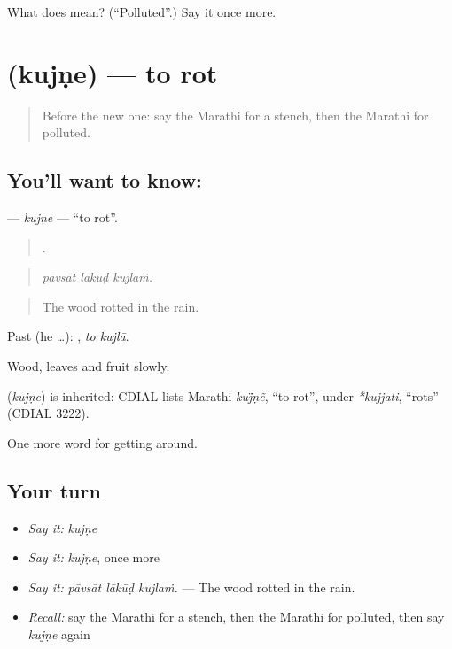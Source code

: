 \begin{tcolorbox}[breakable,colback=teal!4,colframe=teal!35!black,title={Before you move on}]
What does  mean? (\textquotedblleft{}Polluted\textquotedblright{}.) Say it once more.
\end{tcolorbox}
\section[\texorpdfstring{\mr{कुजणे} (kujṇe)}{कुजणे (kujṇe)}]{ (kujṇe) — to rot}

\label{lesson:MR-C448-kujne}



\begin{quote}
Before the new one: say the Marathi for a stench, then the Marathi for polluted.
\end{quote}

\subsection*{You'll want to know: }
\textbf{} — \emph{kujṇe} — \textquotedblleft{}to rot\textquotedblright{}.

\begin{quote}
  .
\end{quote}

\begin{quote}
\emph{pāvsāt lākūḍ kujlaṁ.}
\end{quote}

\begin{quote}
The wood rotted in the rain.
\end{quote}

Past (he …):  , \emph{to kujlā}.

Wood, leaves and fruit  slowly.

\begin{cousinweb}
\textbf{} (\emph{kujṇe}) is inherited: CDIAL lists Marathi \emph{kuj̈ṇẽ}, \textquotedblleft{}to rot\textquotedblright{}, under \emph{*kujjati}, \textquotedblleft{}rots\textquotedblright{} (CDIAL 3222).
\end{cousinweb}

\begin{grammarlens}[title={What you've built}]
One more word for getting around.
\end{grammarlens}

\subsection*{Your turn}
\begin{itemize}
\raggedright
  \item \emph{Say it:} \emph{kujṇe}
  \item \emph{Say it:} \emph{kujṇe}, once more
  \item \emph{Say it:} \emph{pāvsāt lākūḍ kujlaṁ.} — The wood rotted in the rain.
  \item \emph{Recall:} say the Marathi for a stench, then the Marathi for polluted, then say \emph{kujṇe} again
\end{itemize}

